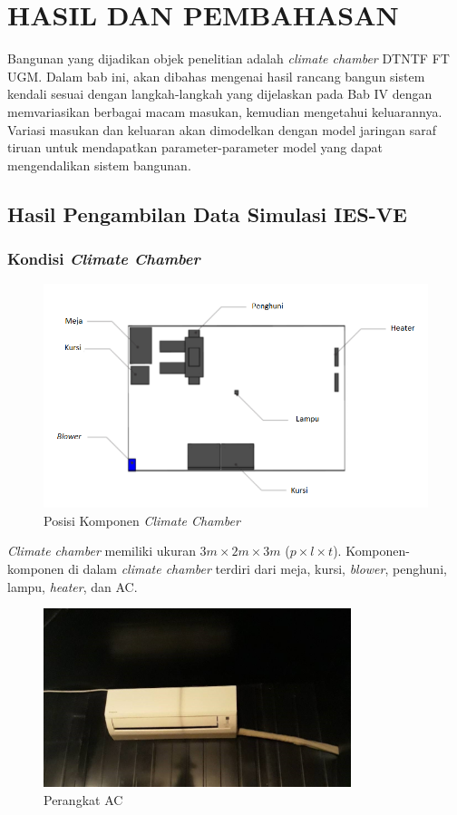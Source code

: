 \chapter{HASIL DAN PEMBAHASAN}
\label{hasil-dan-pembahasan}
Bangunan yang dijadikan objek penelitian adalah \textit{climate chamber} DTNTF FT UGM. Dalam bab ini, akan dibahas mengenai hasil rancang bangun sistem kendali sesuai dengan langkah-langkah yang dijelaskan pada Bab IV dengan memvariasikan berbagai macam masukan, kemudian mengetahui keluarannya. Variasi masukan dan keluaran akan dimodelkan dengan model jaringan saraf tiruan untuk mendapatkan parameter-parameter model yang dapat mengendalikan sistem bangunan.

\section{Hasil Pengambilan Data Simulasi IES-VE}

\subsection{Kondisi \textit{Climate Chamber}}
\begin{figure}[!h]
	\centering
	\includegraphics[width=1\textwidth]{figures/KondisiChamber}
	\caption{Posisi Komponen \textit{Climate Chamber}}
	\label{fig:5:KondisiChamber}
\end{figure}

\textit{Climate chamber} memiliki ukuran $3m \times 2m \times 3m$ ($p \times l \times t$). Komponen-komponen di dalam \textit{climate chamber} terdiri dari meja, kursi, \textit{blower}, penghuni, lampu, \textit{heater}, dan AC. 

\begin{figure}[h]
	\centering
	\includegraphics[width=0.8\textwidth]{figures/AC}
	\caption{Perangkat AC}
	\label{fig:5:AC}
\end{figure}

